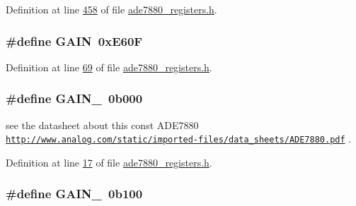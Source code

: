 Definition at line \hyperlink{a00036_source_l00458}{458} of file \hyperlink{a00036_source}{ade7880\-\_\-registers.\-h}.

\hypertarget{a00036_a8c8f27b35dfa40ccf31c1ee31479a31c}{
\subsubsection[{G\-A\-I\-N}]{\setlength{\rightskip}{0pt plus 5cm}\#define G\-A\-I\-N~0x\-E60\-F}}\label{de/d8c/a00036_a8c8f27b35dfa40ccf31c1ee31479a31c}


Definition at line \hyperlink{a00036_source_l00069}{69} of file \hyperlink{a00036_source}{ade7880\-\_\-registers.\-h}.

\hypertarget{a00036_a3c686a06cc9d837e73b259bcc054217e}{
\subsubsection[{G\-A\-I\-N\-\_\-1}]{\setlength{\rightskip}{0pt plus 5cm}\#define G\-A\-I\-N\-\_~0b000}}\label{de/d8c/a00036_a3c686a06cc9d837e73b259bcc054217e}


see the datasheet about this const A\-D\-E7880 \href{http://www.analog.com/static/imported-files/data_sheets/ADE7880.pdf}{\tt http\-://www.\-analog.\-com/static/imported-\/files/data\-\_\-sheets/\-A\-D\-E7880.\-pdf} . 



Definition at line \hyperlink{a00036_source_l00017}{17} of file \hyperlink{a00036_source}{ade7880\-\_\-registers.\-h}.

\hypertarget{a00036_a849e708719d768ea90ada6f58eea52a8}{
\subsubsection[{G\-A\-I\-N\-\_\-16}]{\setlength{\rightskip}{0pt plus 5cm}\#define G\-A\-I\-N\-\_~0b100}}\label{de/d8c/a00036_a849e708719d768ea90ada6f58eea52a8}


